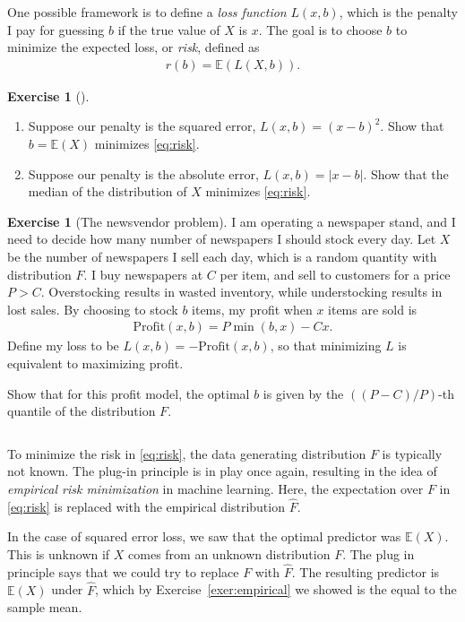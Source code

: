 \documentclass[11pt]{article}
\theoremstyle{definition}
\newtheorem{exercise}[]{Exercise}
\newcommand{\E}{\mathbb{E}}
\begin{document}
One possible framework is to define a \textit{loss function} $L(x, b)$, which is
the penalty I pay for guessing $b$ if the true value of $X$ is $x$.
The goal is to choose $b$ to minimize the expected loss, or \textit{risk}, defined as
\begin{align}
  r(b) = \E(L(X, b)).
  \label{eq:risk}
\end{align}

\begin{exercise}[]
  $\quad$\vspace{-1em}

  \begin{enumerate}[label = (\alph*)]
    \item Suppose our penalty is the squared error, $L(x, b) = (x - b)^2$. Show that $b = \E(X)$ minimizes
    \eqref{eq:risk}.
    \item Suppose our penalty is the absolute error, $L(x, b) = |x - b|$. Show that the median of the
    distribution of $X$ minimizes \eqref{eq:risk}.
  \end{enumerate}
\end{exercise}


\begin{exercise}[The newsvendor problem]
  I am operating a newspaper stand, and I need to decide how many number of newspapers
  I should stock every day.
  Let $X$ be the number of newspapers I sell each day, which is a random quantity with
  distribution $F$.
  I buy newspapers at $C$  per item, and sell to customers for a price $P > C$.
  Overstocking results in wasted inventory, while understocking results in lost sales.
  By choosing to stock $b$ items, my profit when $x$ items
  are sold is
  \begin{align}
    \textrm{Profit}(x, b) = P\min(b, x) - Cx.
  \end{align}
  Define my loss to be $L(x, b) = - \textrm{Profit}(x, b)$, so that
  minimizing $L$ is equivalent to maximizing profit.

  Show that for this profit model, the optimal $b$ is given by the $((P - C)/P)$-th
  quantile of the distribution $F$.

\end{exercise}

$\quad$

To minimize the risk in \eqref{eq:risk}, the data generating distribution
$F$ is typically not known.
The plug-in principle is in play once again, resulting in the idea of
\textit{empirical risk minimization} in machine learning.
Here, the expectation over $F$ in \eqref{eq:risk} is replaced with the empirical
distribution $\hat F$.

In the case of squared error loss, we saw that the optimal predictor was
$\E(X)$. This is unknown if $X$ comes from an unknown distribution $F$.
The plug in principle says that we could try to replace $F$ with $\hat F$.
The resulting predictor is $\E(X)$ under $\hat F$, which by
Exercise~\ref{exer:empirical} we showed is the equal to the sample mean.
\end{document}
